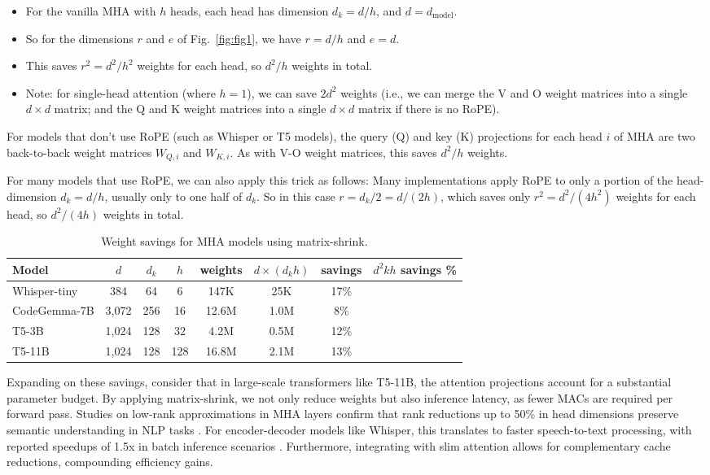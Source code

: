 \documentclass{article}
\begin{document}
\begin{itemize}
\item For the vanilla MHA with $h$ heads, each head has dimension $d_k = d/h$, and $d = d_{\text{model}}$.
\item So for the dimensions $r$ and $e$ of Fig.~\ref{fig:fig1}, we have $r = d/h$ and $e = d$.
\item This saves $r^{2} = d^{2}/h^{2}$ weights for each head, so $d^{2}/h$ weights in total.
\item Note: for single-head attention (where $h = 1$), we can save $2d^{2}$ weights (i.e., we can merge the V and O weight matrices into a single $d \times d$ matrix; and the Q and K weight matrices into a single $d \times d$ matrix if there is no RoPE).
\end{itemize}

For models that don’t use RoPE (such as Whisper \cite{radford2022whisper} or T5 models), the query (Q) and key (K) projections for each head $i$ of MHA are two back-to-back weight matrices $W_{Q,i}$ and $W_{K,i}$. As with V-O weight matrices, this saves $d^{2}/h$ weights.

For many models that use RoPE, we can also apply this trick as follows: Many implementations apply RoPE to only a portion of the head-dimension $d_k = d/h$, usually only to one half of $d_k$. So in this case $r = d_k/2 = d/(2h)$, which saves only $r^{2} = d^{2}/(4h^{2})$ weights for each head, so $d^{2}/(4h)$ weights in total.

\begin{table}[h]
\centering
\begin{tabular}{lccccccc}
\toprule
Model & $d$ & $d_k$ & $h$ & weights & $d \times (d_k h)$ & savings & $d^{2} k h$ savings \% \\
\midrule
Whisper-tiny & 384 & 64 & 6 & 147K & 25K & 17\% \\
CodeGemma-7B & 3,072 & 256 & 16 & 12.6M & 1.0M & 8\% \\
T5-3B & 1,024 & 128 & 32 & 4.2M & 0.5M & 12\% \\
T5-11B & 1,024 & 128 & 128 & 16.8M & 2.1M & 13\% \\
\bottomrule
\end{tabular}
\caption{Weight savings for MHA models using matrix-shrink.}
\label{tab:tab1}
\end{table}

Expanding on these savings, consider that in large-scale transformers like T5-11B, the attention projections account for a substantial parameter budget. By applying matrix-shrink, we not only reduce weights but also inference latency, as fewer MACs are required per forward pass. Studies on low-rank approximations in MHA layers confirm that rank reductions up to 50\% in head dimensions preserve semantic understanding in NLP tasks \cite{medium2023compressing}. For encoder-decoder models like Whisper, this translates to faster speech-to-text processing, with reported speedups of 1.5x in batch inference scenarios \cite{radford2022whisper}. Furthermore, integrating with slim attention \cite{graef2025slim} allows for complementary cache reductions, compounding efficiency gains.
\end{document}

